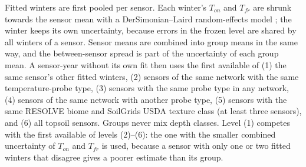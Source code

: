 \documentclass[essd,manuscript]{copernicus}
\begin{document}
Fitted winters are first pooled per sensor. Each winter's $T_{on}$ and
$T_{fr}$ are shrunk towards the sensor mean with a DerSimonian--Laird
random-effects model \citep{dersimonian1986}; the winter keeps its own
uncertainty, because errors in the frozen level are shared by all winters of
a sensor. Sensor means are combined into group means in the same way, and the
between-sensor spread is part of the uncertainty of each group mean. A
sensor-year without its own fit then uses the first available of
(1) the same sensor's other fitted winters, (2) sensors of the same network
with the same temperature-probe type, (3) sensors with the same probe type in
any network, (4) sensors of the same network with another probe type, (5)
sensors with the same RESOLVE biome and SoilGrids USDA texture class
(at least three sensors), and (6) all topsoil sensors. Groups never mix depth
classes. Level (1) competes with the first available of levels (2)--(6): the
one with the smaller combined uncertainty of $T_{on}$ and $T_{fr}$ is used,
because a sensor with only one or two fitted winters that disagree gives a
poorer estimate than its group.
\end{document}
